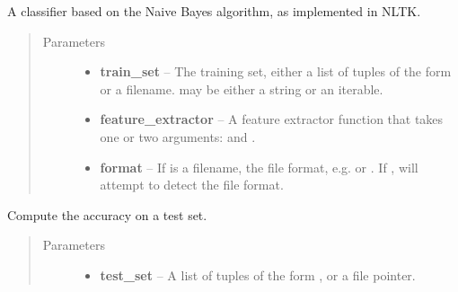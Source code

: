\documentclass[letterpaper,10pt,english]{sphinxmanual}
\begin{document}

\begin{fulllineitems}
\label{api_reference:textblob.classifiers.NaiveBayesClassifier}
A classifier based on the Naive Bayes algorithm, as implemented in
NLTK.
\begin{quote}\begin{description}
\item[{Parameters}] \leavevmode\begin{itemize}
\item {} 
\textbf{train\_set} -- The training set, either a list of tuples of the form
 or a filename.  may be either
a string or an iterable.

\item {} 
\textbf{feature\_extractor} -- A feature extractor function that takes one or
two arguments:  and .

\item {} 
\textbf{format} -- If  is a filename, the file format, e.g.
 or . If , will attempt to detect the
file format.

\end{itemize}

\end{description}\end{quote}


\begin{fulllineitems}
\label{api_reference:textblob.classifiers.NaiveBayesClassifier.accuracy}
Compute the accuracy on a test set.
\begin{quote}\begin{description}
\item[{Parameters}] \leavevmode\begin{itemize}
\item {} 
\textbf{test\_set} -- A list of tuples of the form , or a
file pointer.


\end{itemize}
\end{description}
\end{quote}
\end{fulllineitems}
\end{fulllineitems}
\end{document}
